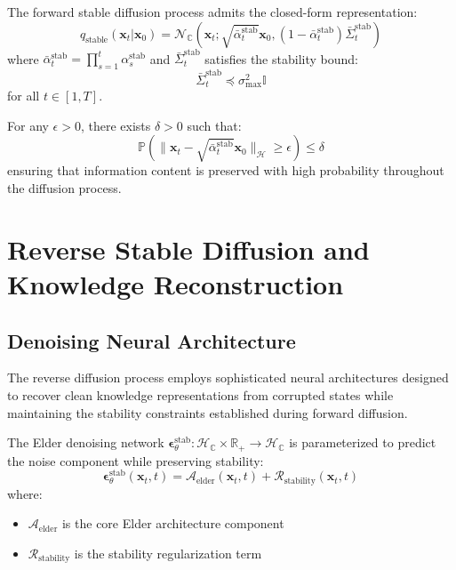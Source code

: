 \begin{theorem}
The forward stable diffusion process admits the closed-form representation:
\begin{equation}
q_{\text{stable}}(\mathbf{x}_t | \mathbf{x}_0) = \mathcal{N}_{\mathbb{C}}(\mathbf{x}_t; \sqrt{\bar{\alpha}_t^{\text{stab}}} \mathbf{x}_0, (1-\bar{\alpha}_t^{\text{stab}}) \bar{\Sigma}_t^{\text{stab}})
\end{equation}
where $\bar{\alpha}_t^{\text{stab}} = \prod_{s=1}^t \alpha_s^{\text{stab}}$ and $\bar{\Sigma}_t^{\text{stab}}$ satisfies the stability bound:
\begin{equation}
\bar{\Sigma}_t^{\text{stab}} \preceq \sigma_{\text{max}}^2 \mathbb{I}
\end{equation}
for all $t \in [1, T]$.
\end{theorem}

\begin{corollary}
For any $\epsilon > 0$, there exists $\delta > 0$ such that:
\begin{equation}
\mathbb{P}\left(\|\mathbf{x}_t - \sqrt{\bar{\alpha}_t^{\text{stab}}} \mathbf{x}_0\|_{\mathcal{H}} \geq \epsilon\right) \leq \delta
\end{equation}
ensuring that information content is preserved with high probability throughout the diffusion process.
\end{corollary}

\section{Reverse Stable Diffusion and Knowledge Reconstruction}

\subsection{Denoising Neural Architecture}

The reverse diffusion process employs sophisticated neural architectures designed to recover clean knowledge representations from corrupted states while maintaining the stability constraints established during forward diffusion.

\begin{definition}
The Elder denoising network $\boldsymbol{\epsilon}_\theta^{\text{stab}}: \mathcal{H}_{\mathbb{C}} \times \mathbb{R}_+ \to \mathcal{H}_{\mathbb{C}}$ is parameterized to predict the noise component while preserving stability:
\begin{equation}
\boldsymbol{\epsilon}_\theta^{\text{stab}}(\mathbf{x}_t, t) = \mathcal{A}_{\text{elder}}(\mathbf{x}_t, t) + \mathcal{R}_{\text{stability}}(\mathbf{x}_t, t)
\end{equation}
where:
\begin{itemize}
\item $\mathcal{A}_{\text{elder}}$ is the core Elder architecture component
\item $\mathcal{R}_{\text{stability}}$ is the stability regularization term
\end{itemize}
\end{definition}

